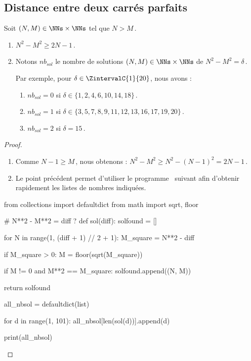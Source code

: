 

\subsection{Distance entre deux carrés parfaits}

\begin{fact} \label{diff-square-ko}
	Soit $(N, M) \in \NNs \times \NNs$ tel que $N > M$\,.
	\begin{enumerate}
		\item $N^2 - M^2 \geq 2N - 1$\,.
		
		\item Notons $nb_{sol}$ le nombre de solutions $(N, M) \in \NNs \times \NNs$ de $N^2 - M^2 = \delta$\,.
		
		\smallskip
		\noindent
		Par exemple, pour $\delta \in \ZintervalC{1}{20}$, nous avons :
		\begin{enumerate}
			\item $nb_{sol}= 0$ si $\delta \in \{ 1, 2, 4, 6, 10, 14, 18\}$\,.

			\item $nb_{sol}= 1$ si $\delta \in \{ 3, 5, 7, 8, 9, 11, 12, 13, 16, 17, 19, 20 \}$\,.

			\item $nb_{sol}= 2$ si $\delta = 15$\,.
		\end{enumerate}
	\end{enumerate}
\end{fact}


\begin{proof}
	\leavevmode
	
	\vspace{-1ex}
	\begin{enumerate}
		\item Comme $N - 1 \geq M$\,, nous obtenons :
		$N^2 - M^2 \geq N^2 - (N - 1)^2 = 2N - 1$\,.

		\item Le point précédent permet d'utiliser le programme \python\ suivant afin d'obtenir rapidement les listes de nombres indiquées.
	\end{enumerate}

\bgroup
\small
\begin{Python}
from collections import defaultdict
from math        import sqrt, floor

# N**2 - M**2 = diff ?
def sol(diff):
    solfound = []

    for N in range(1, (diff + 1) // 2 + 1):
        M_square = N**2 - diff

        if M_square > 0:
            M = floor(sqrt(M_square))

            if M != 0 and M**2 == M_square:
                solfound.append((N, M))

    return solfound

all_nbsol = defaultdict(list)

for d in range(1, 101):
    all_nbsol[len(sol(d))].append(d)

print(all_nbsol)
\end{Python}
\egroup	


		\qedhere
\end{proof}

